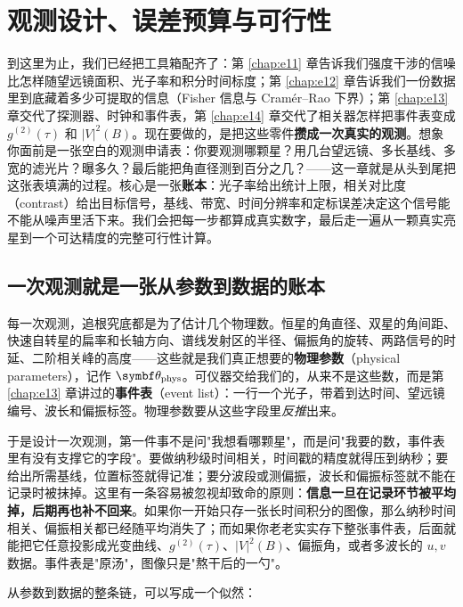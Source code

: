 \chapter{观测设计、误差预算与可行性}
\label{chap:e15}

\begin{chapteropening}
到这里为止，我们已经把工具箱配齐了：第 \ref{chap:e11} 章告诉我们强度干涉的信噪比怎样随望远镜面积、光子率和积分时间标度；第 \ref{chap:e12} 章告诉我们一份数据里到底藏着多少可提取的信息（Fisher 信息与 Cramér--Rao 下界）；第 \ref{chap:e13} 章交代了探测器、时钟和事件表，第 \ref{chap:e14} 章交代了相关器怎样把事件表变成 \(g^{(2)}(\tau)\) 和 \(|V|^2(B)\)。现在要做的，是把这些零件\textbf{攒成一次真实的观测}。想象你面前是一张空白的观测申请表：你要观测哪颗星？用几台望远镜、多长基线、多宽的滤光片？曝多久？最后能把角直径测到百分之几？——这一章就是从头到尾把这张表填满的过程。核心是一张\textbf{账本}：光子率给出统计上限，相关对比度（contrast）给出目标信号，基线、带宽、时间分辨率和定标误差决定这个信号能不能从噪声里活下来。我们会把每一步都算成真实数字，最后走一遍从一颗真实亮星到一个可达精度的完整可行性计算。
\end{chapteropening}

\section{一次观测就是一张从参数到数据的账本}
\label{sec:e15-ledger}

每一次观测，追根究底都是为了估计几个物理数。恒星的角直径、双星的角间距、快速自转星的扁率和长轴方向、谱线发射区的半径、偏振角的旋转、两路信号的时延、二阶相关峰的高度——这些就是我们真正想要的\textbf{物理参数}（physical parameters），记作 \(\bm\theta_{\rm phys}\)。可仪器交给我们的，从来不是这些数，而是第 \ref{chap:e13} 章讲过的\textbf{事件表}（event list）：一行一个光子，带着到达时间、望远镜编号、波长和偏振标签。物理参数要从这些字段里\emph{反推}出来。

于是设计一次观测，第一件事不是问"我想看哪颗星"，而是问"我要的数，事件表里有没有支撑它的字段"。要做纳秒级时间相关，时间戳的精度就得压到纳秒；要给出所需基线，位置标签就得记准；要分波段或测偏振，波长和偏振标签就不能在记录时被抹掉。这里有一条容易被忽视却致命的原则：\textbf{信息一旦在记录环节被平均掉，后期再也补不回来}。如果你一开始只存一张长时间积分的图像，那么纳秒时间相关、偏振相关都已经随平均消失了；而如果你老老实实存下整张事件表，后面就能把它任意投影成光变曲线、\(g^{(2)}(\tau)\)、\(|V|^2(B)\)、偏振角，或者多波长的 \(u,v\) 数据。事件表是"原汤"，图像只是"熬干后的一勺"。

从参数到数据的整条链，可以写成一个似然：

